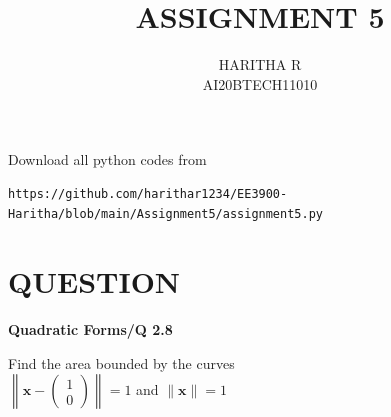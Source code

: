 \documentclass[journal,12pt,twocolumn]{IEEEtran}
\begin{document}
\providecommand{\mtx}[1]{\mathbf{#1}}
\providecommand{\mean}[1]{E[ #1 ]}
\providecommand{\fourier}{\overset{\mathcal{F}}{ \rightleftharpoons}}
\providecommand{\system}{\overset{\mathcal{H}}{ \longleftrightarrow}}
\newcommand{\solution}{\noindent \textbf{Solution: }}
\newcommand{\cosec}{\,\text{cosec}\,}
\providecommand{\dec}[2]{\ensuremath{\overset{#1}{\underset{#2}{\gtrless}}}}
\newcommand{\myvec}[1]{\ensuremath{\begin{pmatrix}#1\end{pmatrix}}}
\newcommand{\mydet}[1]{\ensuremath{\begin{vmatrix}#1\end{vmatrix}}}
\newcommand*{\permcomb}[4][0mu]{{{}^{#3}\mkern#1#2_{#4}}}
\newcommand*{\perm}[1][-3mu]{\permcomb[#1]{P}}
\newcommand*{\comb}[1][-1mu]{\permcomb[#1]{C}}
\makeatletter
{}
\makeatother
\let\StandardTheFigure\thefigure
\let\vec\mathbf
\renewcommand{\thefigure}{\theproblem}
\def\putbox#1#2#3{\makebox[0in][l]{\makebox[#1][l]{}\raisebox{\baselineskip}[0in][0in]{\raisebox{#2}[0in][0in]{#3}}}}
     \def\rightbox#1{\makebox[0in][r]{#1}}
     \def\centbox#1{\makebox[0in]{#1}}
     \def\topbox#1{\raisebox{-\baselineskip}[0in][0in]{#1}}
     \def\midbox#1{\raisebox{-0.5\baselineskip}[0in][0in]{#1}}
\vspace{3cm}
\title{ ASSIGNMENT 5}
\author{HARITHA R\\ AI20BTECH11010}
\maketitle
\newpage
\bigskip
\newcommand\norm[1]{\left\lVert#1\right\rVert}

\renewcommand{\thefigure}{\arabic{figure}}
\renewcommand{\thetable}{\arabic{table}}
Download all python codes from
\begin{lstlisting}
https://github.com/harithar1234/EE3900-Haritha/blob/main/Assignment5/assignment5.py
\end{lstlisting}
\section*{QUESTION}
\textbf{Quadratic Forms/Q 2.8}
\begin{enumerate}
Find the area bounded by the curves  \\ 
$ \norm{\vec{x}-\myvec{1 \\0}} =1 $ and $\| \vec{x} \| =1 $ 
\end{enumerate}
\end{document}
